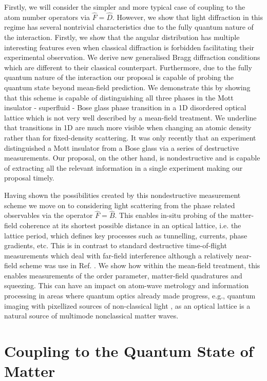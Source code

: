 Firstly, we will consider the simpler and more typical case of
coupling to the atom number operators via $\hat{F} =
\hat{D}$. However, we show that light diffraction in this regime has
several nontrivial characteristics due to the fully quantum nature of
the interaction. Firstly, we show that the angular distribution has
multiple interesting features even when classical diffraction is
forbidden facilitating their experimental observation. We derive new
generalised Bragg diffraction conditions which are different to their
classical counterpart. Furthermore, due to the fully quantum nature of
the interaction our proposal is capable of probing the quantum state
beyond mean-field prediction. We demonstrate this by showing that this
scheme is capable of distinguishing all three phases in the Mott
insulator - superfluid - Bose glass phase transition in a 1D
disordered optical lattice which is not very well described by a
mean-field treatment. We underline that transitions in 1D are much
more visible when changing an atomic density rather than for
fixed-density scattering. It was only recently that an experiment
distinguished a Mott insulator from a Bose glass \cite{derrico2014}
via a series of destructive measurements. Our proposal, on the other
hand, is nondestructive and is capable of extracting all the relevant
information in a single experiment making our proposal timely.

Having shown the possibilities created by this nondestructive
measurement scheme we move on to considering light scattering from the
phase related observables via the operator $\hat{F} = \hat{B}$. This
enables in-situ probing of the matter-field coherence at its shortest
possible distance in an optical lattice, i.e. the lattice period,
which defines key processes such as tunnelling, currents, phase
gradients, etc. This is in contrast to standard destructive
time-of-flight measurements which deal with far-field interference
although a relatively near-field scheme was use in
Ref. \cite{miyake2011}. We show how within the mean-field treatment,
this enables measurements of the order parameter, matter-field
quadratures and squeezing. This can have an impact on atom-wave
metrology and information processing in areas where quantum optics
already made progress, e.g., quantum imaging with pixellized sources
of non-classical light \cite{golubev2010, kolobov1999}, as an optical
lattice is a natural source of multimode nonclassical matter waves.

\section{Coupling to the Quantum State of Matter}

